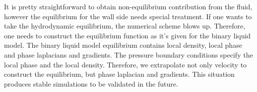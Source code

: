 \documentclass{article}
\begin{document}
It is pretty straightforward to obtain non-equilibrium contribution from the
fluid, however the equilibrium for the wall side needs special treatment. If
one wants to take the hydrodynamic equilibrium, the numerical scheme blows
up. Therefore, one needs to construct the equilibrium function as it's given
for the binary liquid model. The binary liquid model equilibrium contains local
density, local phase and phase laplacians and gradients. The pressure boundary
conditions specify the local phase and the local density. Therefore, we
extrapolate not only velocity to construct the equilibrium, but phase laplacian
and gradients. This situation produces stable simulations to be validated in
the future. 


\end{document}
